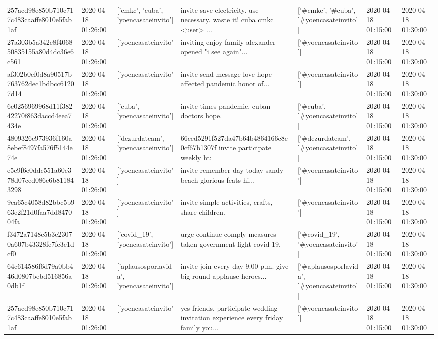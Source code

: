 \begin{tabular}{lllllll}
257acd98e850b710c717c483caaffe8010e5fab1af & 2020-04-18 01:26:00 & ['cmkc', 'cuba', 'yoencasateinvito'] & invite save electricity. use necessary. waste it! cuba cmkc <user> ... & ['#cmkc', '#cuba', '#yoencasateinvito'] & 2020-04-18 01:15:00 & 2020-04-18 01:30:00 \\
27a303b5a342e8f406850835155a80d4dc36e6c561 & 2020-04-18 01:26:00 & ['yoencasateinvito'] & inviting enjoy family alexander opened "i see again"... & ['#yoencasateinvito'] & 2020-04-18 01:15:00 & 2020-04-18 01:30:00 \\
af302b0ef0d8a90517b763762dec1bdbcc61207d14 & 2020-04-18 01:26:00 & ['yoencasateinvito'] & invite send message love hope affected pandemic honor of... & ['#yoencasateinvito'] & 2020-04-18 01:15:00 & 2020-04-18 01:30:00 \\
6e0256969968d11f38242270f863daccd4eea7434e & 2020-04-18 01:26:00 & ['cuba', 'yoencasateinvito'] & invite times pandemic, cuban doctors hope. & ['#cuba', '#yoencasateinvito'] & 2020-04-18 01:15:00 & 2020-04-18 01:30:00 \\
4809326c973936f160a8ebef8497fa576f5144e74e & 2020-04-18 01:26:00 & ['dezurdateam', 'yoencasateinvito'] & 66ced5291f527da47b64b4864166c8e0cf67b1307f invite participate weekly ht: & ['#dezurdateam', '#yoencasateinvito'] & 2020-04-18 01:15:00 & 2020-04-18 01:30:00 \\
e5c9f6e0ddc551a60e378d07ced086e6b811843298 & 2020-04-18 01:26:00 & ['yoencasateinvito'] & invite remember day today sandy beach glorious feats hi... & ['#yoencasateinvito'] & 2020-04-18 01:15:00 & 2020-04-18 01:30:00 \\
9ca65c4058d82bbc5b963e2f21d0faa7dd847004fa & 2020-04-18 01:26:00 & ['yoencasateinvito'] & invite simple activities, crafts, share children. & ['#yoencasateinvito'] & 2020-04-18 01:15:00 & 2020-04-18 01:30:00 \\
f3472a7148c5b3e23070a607b43328fe7fe3e1dcf0 & 2020-04-18 01:26:00 & ['covid_19', 'yoencasateinvito'] & urge continue comply measures taken government fight covid-19. & ['#covid_19', '#yoencasateinvito'] & 2020-04-18 01:15:00 & 2020-04-18 01:30:00 \\
64c614586f6d79a0bb446d0807bebd516856a0db1f & 2020-04-18 01:26:00 & ['aplausosporlavida', 'yoencasateinvito'] & invite join every day 9:00 p.m. give big round applause heroes... & ['#aplausosporlavida', '#yoencasateinvito'] & 2020-04-18 01:15:00 & 2020-04-18 01:30:00 \\
257acd98e850b710c717c483caaffe8010e5fab1af & 2020-04-18 01:26:00 & ['yoencasateinvito'] & yes friends, participate wedding invitation experience every friday family you... & ['#yoencasateinvito'] & 2020-04-18 01:15:00 & 2020-04-18 01:30:00 \\

\end{tabular}
